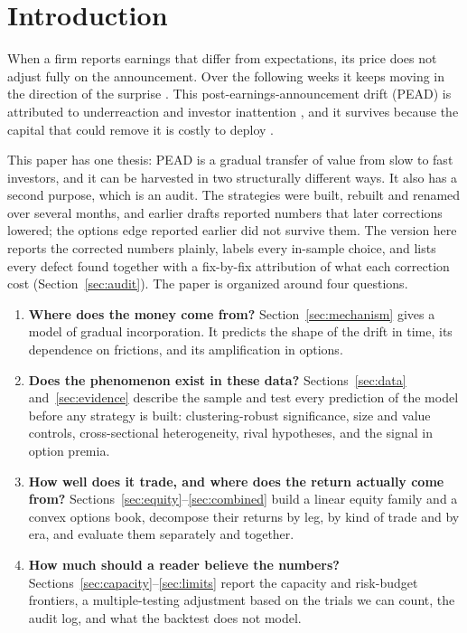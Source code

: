 \documentclass[11pt]{article}
\theoremstyle{definition}
\newcommand{\1}{\mathbf{1}}
\begin{document}
\tableofcontents
\newpage

\section{Introduction}\label{sec:intro}

When a firm reports earnings that differ from expectations, its price does not adjust fully on the
announcement. Over the following weeks it keeps moving in the direction of the surprise
\citep{BallBrown1968,BernardThomas1989,BernardThomas1990}. This post-earnings-announcement drift
(PEAD) is attributed to underreaction and investor inattention
\citep{HongStein1999,HirshleiferLimTeoh2009,DellaVignaPollet2009}, and it survives because the
capital that could remove it is costly to deploy \citep{ShleiferVishny1997,Mendenhall2004}.

This paper has one thesis: PEAD is a gradual transfer of value from slow to fast investors, and it
can be harvested in two structurally different ways. It also has a second purpose, which is an
audit. The strategies were built, rebuilt and renamed over several months, and earlier drafts
reported numbers that later corrections lowered; the options edge reported earlier did not survive them. The version here reports the corrected numbers plainly,
labels every in-sample choice, and lists every defect found together with a fix-by-fix attribution of what each correction cost (Section~\ref{sec:audit}). The paper is
organized around four questions.
\begin{enumerate}[label=(\roman*)]
  \item \textbf{Where does the money come from?} Section~\ref{sec:mechanism} gives a model of
        gradual incorporation. It predicts the shape of the drift in time, its dependence on
        frictions, and its amplification in options.
  \item \textbf{Does the phenomenon exist in these data?} Sections~\ref{sec:data}
        and~\ref{sec:evidence} describe the sample and test every prediction of the model before any
        strategy is built: clustering-robust significance, size and value controls, cross-sectional
        heterogeneity, rival hypotheses, and the signal in option premia.
  \item \textbf{How well does it trade, and where does the return actually come from?}
        Sections~\ref{sec:equity}--\ref{sec:combined} build a linear equity family and a convex
        options book, decompose their returns by leg, by kind of trade and by era, and evaluate
        them separately and together.
  \item \textbf{How much should a reader believe the numbers?} Sections~\ref{sec:capacity}--\ref{sec:limits}
        report the capacity and risk-budget frontiers, a multiple-testing adjustment based on the
        trials we can count, the audit log, and what the backtest does not model.
\end{enumerate}
\end{document}
